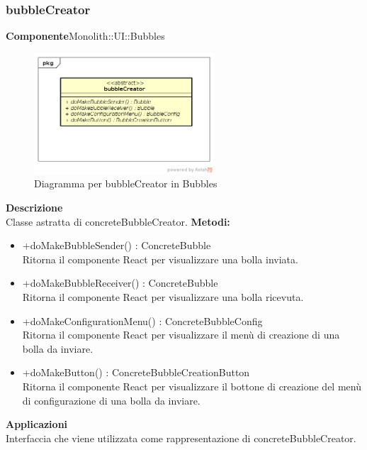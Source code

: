 \subsubsection{bubbleCreator}
\textbf{Componente}Monolith::UI::Bubbles\\
   \FloatBarrier
   \begin{figure}[ht]
   \centering
   \includegraphics[width=0.6\textwidth]{img/single-bubbleCreator}
   \caption{{Diagramma per bubbleCreator in Bubbles}}
\end{figure}
\FloatBarrier
\textbf{Descrizione}\\
Classe astratta di concreteBubbleCreator.
\textbf{Metodi:} \\
\begin{itemize}\item +doMakeBubbleSender() : ConcreteBubble \\Ritorna il componente React per visualizzare una bolla inviata.\item +doMakeBubbleReceiver() : ConcreteBubble \\Ritorna il componente React per visualizzare una bolla ricevuta.\item +doMakeConfigurationMenu() : ConcreteBubbleConfig \\Ritorna il componente React per visualizzare il menù di creazione di una bolla da inviare.\item +doMakeButton() : ConcreteBubbleCreationButton \\Ritorna il componente React per visualizzare il bottone di creazione del menù di configurazione di una bolla da inviare.

\end{itemize} 


\textbf{Applicazioni}\\
Interfaccia che viene utilizzata come rappresentazione di concreteBubbleCreator. 


\clearpage

